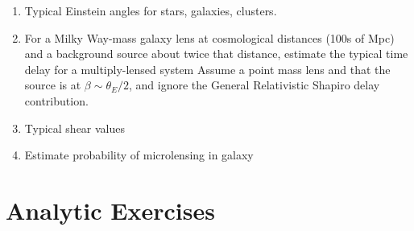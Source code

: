\begin{enumerate} 
\item Typical Einstein angles for stars, galaxies, clusters.
\item For a Milky Way-mass galaxy lens at cosmological distances (100s
    of Mpc) and a background source about twice that distance,
    estimate the typical time delay for a multiply-lensed system
    Assume a point mass lens and that the source is at
    $\beta\sim \theta_E/2$, and ignore the General Relativistic
    Shapiro delay contribution. 
\item Typical shear values
\item Estimate probability of microlensing in galaxy
\end{enumerate}   

\section{Analytic Exercises}


